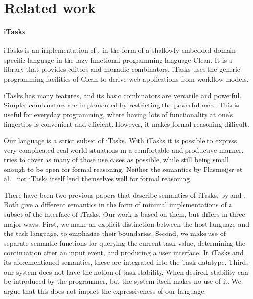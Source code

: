 


\section{Related work}
\label{sec:relatedwork}



\paragraph{iTasks}

iTasks is an implementation of \TOP, in the form of a shallowly embedded domain-specific language in the lazy functional programming language Clean.
It is a library that provides editors and monadic combinators.
iTasks uses the generic programming facilities of Clean to derive web applications from workflow models.

iTasks has many features, and its basic combinators are versatile and powerful.
Simpler combinators are implemented by restricting the powerful ones.
This is useful for everyday programming, where having lots of functionality at one's fingertips is convenient and efficient.
However, it makes formal reasoning difficult.

Our language is a strict subset of iTasks.
With iTasks it is possible to express very complicated real-world situations in a comfortable and productive manner.
\TOPHAT tries to cover as many of those use cases as possible, while still being small enough to be open for formal reasoning.
Neither the semantics by Plasmeijer et al.~\cite{conf/ppdp/PlasmeijerLMAK12} nor iTasks itself lend themselves well for formal reasoning.

There have been two previous papers that describe semantics of iTasks, by \citet{conf/ifl/KoopmanPA08} and \citet{conf/ppdp/PlasmeijerLMAK12}.
Both give a different semantics in the form of minimal implementations of a subset of the interface of iTasks.
Our work is based on them, but differs in three major ways.
First, we make an explicit distinction between the host language and the task language, to emphasize their boundaries.
Second, we make use of separate semantic functions for querying the current task value, determining the continuation after an input event, and producing a user interface.
In iTasks and its aforementioned semantics, these are integrated into the Task datatype.
Third, our system does not have the notion of task stability.
When desired, stability can be introduced by the programmer, but the system itself makes no use of it.
We argue that this does not impact the expressiveness of our language.

